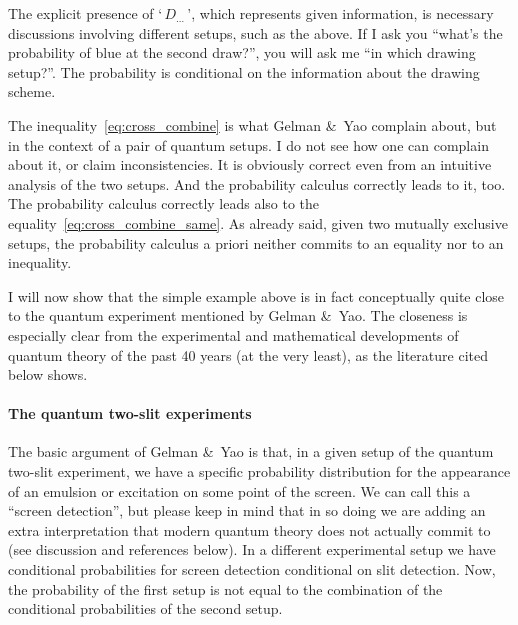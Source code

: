 \documentclass[\ifafour a4paper,12pt,\else a5paper,10pt,\fi%
onecolumn,oneside,article,%
british%
]{memoir}
\newcommand*{\defquote}[1]{`\,#1\,'}
\theoremstyle{remark}
\theoremstyle{innote}
\newcommand*{\citey}{\parencites*}
\newcommand*{\amp}{\&}
\renewcommand*{\|}[1][]{\nonscript\,#1\vert\nonscript\;\mathopen{}}
\begin{document}
\medskip


The explicit presence of \defquote{$D_{\dotso}$}, which represents given
information, is necessary discussions involving different setups, such as
the above. If I ask you \enquote{what's the probability of blue at the
  second draw?}, you will ask me \enquote{in which drawing setup?}. The
probability is conditional on the information about the drawing scheme.


\medskip

The inequality~\eqref{eq:cross_combine} is what Gelman \amp\ Yao
\citey[p.~2]{gelmanetal2020} complain about, but in the context of a pair
of quantum setups. I do not see how one can complain about it, or claim
inconsistencies. It is obviously correct even from an intuitive analysis of
the two setups. And the probability calculus correctly leads to it, too.
The probability calculus correctly leads also to the
equality~\eqref{eq:cross_combine_same}. As already said, given two mutually
exclusive setups, the probability calculus a priori neither commits to an
equality nor to an inequality.


I will now show that the simple example above is in fact conceptually quite
close to the quantum experiment mentioned by Gelman \amp\ Yao. The
closeness is especially clear from the experimental and mathematical
developments of quantum theory of the past 40 years (at the very least), as
the literature cited below shows.

\bigskip

\paragraph{The quantum two-slit experiments}

The basic argument of Gelman \amp\ Yao is that, in a given setup of the
quantum two-slit experiment, we have a specific probability distribution
for the appearance of an emulsion or excitation on some point of the
screen. We can call this a \enquote{screen detection}, but please keep in
mind that in so doing we are adding an extra interpretation that modern
quantum theory does not actually commit to (see discussion and references
below). In a different experimental setup we have conditional probabilities
for screen detection conditional on slit detection. Now, the probability of
the first setup is not equal to the combination of the conditional
probabilities of the second setup.
\end{document}
